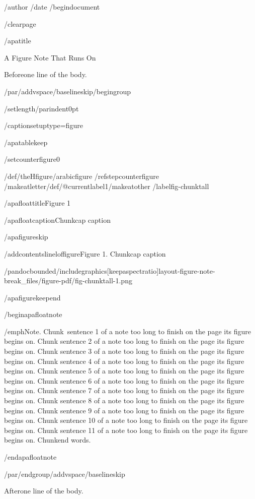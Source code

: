 /author{}
/date{}
/begin{document}


/clearpage

/apatitle{

A Figure Note That Runs On

}

Beforeone line of the body.

/par/addvspace{/baselineskip}/begingroup

/setlength{/parindent}{0pt}

/captionsetup{type=figure}

/apatablekeep

/setcounter{figure}{0}

/def/theHfigure{/arabic{figure}}%
/refstepcounter{figure}%
/makeatletter/def/@currentlabel{1}/makeatother%
/label{fig-chunktall}

/apafloattitle{Figure 1}

/apafloatcaption{Chunkcap caption}

/apafigureskip

/addcontentsline{lof}{figure}{Figure 1. Chunkcap caption}

/pandocbounded{/includegraphics[keepaspectratio]{layout-figure-note-break_files/figure-pdf/fig-chunktall-1.png}}

/apafigurekeepend

/begin{apafloatnote}

/emph{Note}. Chunk~sentence 1 of a note too long to finish on the page
its figure begins on. Chunk sentence 2 of a note too long to finish on
the page its figure begins on. Chunk sentence 3 of a note too long to
finish on the page its figure begins on. Chunk sentence 4 of a note too
long to finish on the page its figure begins on. Chunk sentence 5 of a
note too long to finish on the page its figure begins on. Chunk sentence
6 of a note too long to finish on the page its figure begins on. Chunk
sentence 7 of a note too long to finish on the page its figure begins
on. Chunk sentence 8 of a note too long to finish on the page its figure
begins on. Chunk sentence 9 of a note too long to finish on the page its
figure begins on. Chunk sentence 10 of a note too long to finish on the
page its figure begins on. Chunk sentence 11 of a note too long to
finish on the page its figure begins on. Chunkend words.

/end{apafloatnote}

/par/endgroup/addvspace{/baselineskip}

Afterone line of the body.

